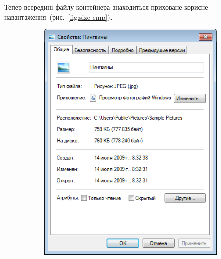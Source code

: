 \documentclass[
	a4paper,
	oneside,
	BCOR = 10mm,
	DIV = 12,
	12pt,
	headings = normal,
]{scrartcl}
\newlength{\gridunitwidth}
\begin{document}
		Тепер всередині файлу контейнера знаходиться приховане корисне навантаження~(рис.~\ref{fig:size-cmp}).

		\begin{figure}[!htbp]
			\begin{subfigure}[b]{6 \gridunitwidth - 1em / (2-1)}
				\includegraphics[width = \columnwidth]{./assets/p18.png}
				\caption{}
				\label{subfig:size-cmp-before}
			\end{subfigure}%
			\hspace{1em}%
			\begin{subfigure}[b]{6 \gridunitwidth - 1em / (2-1)}

\end{subfigure}
\end{figure}
\end{document}
